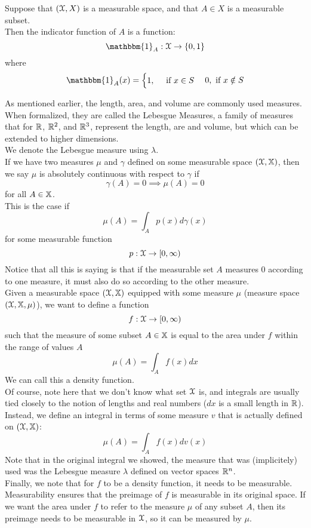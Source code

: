 \documentclass[12pt]{article}
\begin{document}
    Suppose that $(\mathcal{X}, X)$ is a measurable
    space,
    and that $A \in X$ is a measurable subset. \\
    Then the indicator function of $A$ is a function:
    \[ \mathbbm{1}_A: \xcal \to \{0, 1\} \]
    where
    \[
        \mathbbm{1}_A(x) = 
        \piecewise
        {1, \quad \text{ if } x \in S }
        {0, \text{ if } x \notin S}
    \]

    As mentioned earlier,
    the length, area, and volume are commonly
    used measures. \\
    When formalized, they are called
    the Lebesgue Measures,
    a family of measures that for $\mathbb{R}$,
    $\mathbb{R}^2$, and $\mathbb{R}^3$,
    represent the length, are and volume,
    but which can be extended to higher
    dimensions. \\
    We denote the Lebesgue measure using
    $\lambda$. \\

    If we have two measures $\mu$ and $\gamma$
    defined on some measurable space
    $(\mathcal{X}, \mathbb{X})$, then we say
    $\mu$ is absolutely continuous with respect
    to $\gamma$ if
    \[ \gamma(A) = 0 \implies \mu(A) = 0 \]
    for all $A \in \mathbb{X}$. \\
    This is the case if
    \[ \mu(A) = \int_{A}p(x)d\gamma(x) \]
    for some measurable function 
    \[ p: \mathcal{X} \to [0, \infty) \]
    Notice that all this is saying is that
    if the measurable set $A$
    measures 0 according to one measure,
    it must also do so according to
    the other measure. \\

    Given a measurable space
    $(\mathcal{X}, \mathbb{X})$
    equipped with some measure $\mu$
    (measure space  $(\mathcal{X}, \mathbb{X}, \mu)$),
    we want to define a function
    \[f:\mathcal{X} \to [0, \infty) \]
    such that the measure of some subset
    $A \in \mathbb{X}$ is equal to the area
    under $f$ within the range of values $A$
    \[ \mu(A) = \int_{A}f(x)dx \]
    We can call this a density function. \\
    Of course, note here that
    we don't know what set $\mathcal{X}$ is,
    and integrals are usually tied closely
    to the notion of lengths and real numbers
    ($dx$ is a small length in $\mathbb{R}$). \\
    Instead, we define an integral in terms
    of some measure $v$ that is actually
    defined on $(\mathcal{X}, \mathbb{X})$:
    \[ \mu(A) = \int_{A}f(x)dv(x) \]
    Note that in the original integral
    we showed, the measure that was (implicitely)
    used was the Lebesgue measure $\lambda$
    defined on vector spaces $\mathbb{R}^n$. \\
    Finally, we note that for $f$
    to be a density function,
    it needs to be measurable. \\
    Measurability ensures that the preimage of
    $f$ is measurable in its original space.
    If we want the area under $f$ to refer
    to the measure $\mu$ of any subset $A$,
    then its preimage needs to be measurable
    in $\mathcal{X}$,
    so it can be measured by $\mu$. \\
\end{document}
